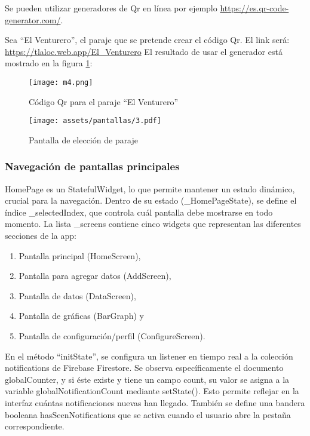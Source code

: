 Se pueden utilizar generadores de Qr en línea por ejemplo \url{https://es.qr-code-generator.com/}.

  Sea ``El Venturero'', el paraje que se pretende crear el código Qr. El link será:
  \url{https://tlaloc.web.app/El_Venturero}
  El resultado de usar el generador está mostrado en la figura \ref{m4}:
  \begin{figure}[h!]
  \centering
    \texttt{[image: m4.png]}
    \caption{Código Qr para el paraje ``El Venturero''}
    \label{m4}
  \end{figure}


\begin{figure}[h!]
\centering
  \texttt{[image: assets/pantallas/3.pdf]}
  \caption{Pantalla de elección de paraje}
  \label{pantallas3}
\end{figure}
\newpage




\newpage
\subsubsection{Navegación de pantallas principales}

HomePage es un StatefulWidget, lo que permite mantener un estado dinámico, crucial para la navegación. Dentro de su estado (\_HomePageState), se define el índice \_selectedIndex, que controla cuál pantalla debe mostrarse en todo momento. La lista \_screens contiene cinco widgets que representan las diferentes secciones de la app: 
\begin{enumerate}
  \item Pantalla principal (HomeScreen),
  \item Pantalla para agregar datos (AddScreen),
  \item Pantalla de datos (DataScreen), 
  \item Pantalla de gráficas (BarGraph) y
  \item Pantalla de configuración/perfil (ConfigureScreen).
\end{enumerate}

En el método ``initState'', se configura un listener en tiempo real a la colección notifications de Firebase Firestore. Se observa específicamente el documento globalCounter, y si éste existe y tiene un campo count, su valor se asigna a la variable globalNotificationCount mediante setState(). Esto permite reflejar en la interfaz cuántas notificaciones nuevas han llegado. También se define una bandera booleana hasSeenNotifications que se activa cuando el usuario abre la pestaña correspondiente.

